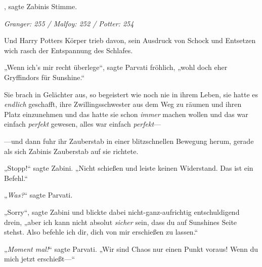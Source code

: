 , sagte Zabinis Stimme.

\later

\emph{Granger: 255 / Malfoy: 252 / Potter: 254}

Und Harry Potters Körper trieb davon, sein Ausdruck von Schock und Entsetzen wich rasch der Entspannung des Schlafes.

„Wenn ich’s mir recht überlege“, sagte Parvati fröhlich, „wohl doch eher Gryffindors für Sunshine.“

Sie brach in Gelächter aus, so begeistert wie noch nie in ihrem Leben, sie hatte es \emph{endlich} geschafft, ihre Zwillingsschwester aus dem Weg zu räumen und ihren Platz einzunehmen und das hatte sie schon \emph{immer} machen wollen und das war einfach \emph{perfekt} gewesen, alles war einfach \emph{perfekt}—

—und dann fuhr ihr Zauberstab in einer blitzschnellen Bewegung herum, gerade als sich Zabinis Zauberstab auf sie richtete.

„Stopp!“ sagte Zabini. „Nicht schießen und leiste keinen Widerstand. Das ist ein Befehl.“

„\emph{Was?}“ sagte Parvati.

„Sorry“, sagte Zabini und blickte dabei nicht-ganz-aufrichtig entschuldigend drein, „aber ich kann nicht absolut \emph{sicher} sein, dass du auf Sunshines Seite stehst. Also befehle ich dir, dich von mir erschießen zu lassen.“

„\emph{Moment mal!}“ sagte Parvati. „Wir sind Chaos nur einen Punkt voraus! Wenn du mich jetzt erschießt—“

